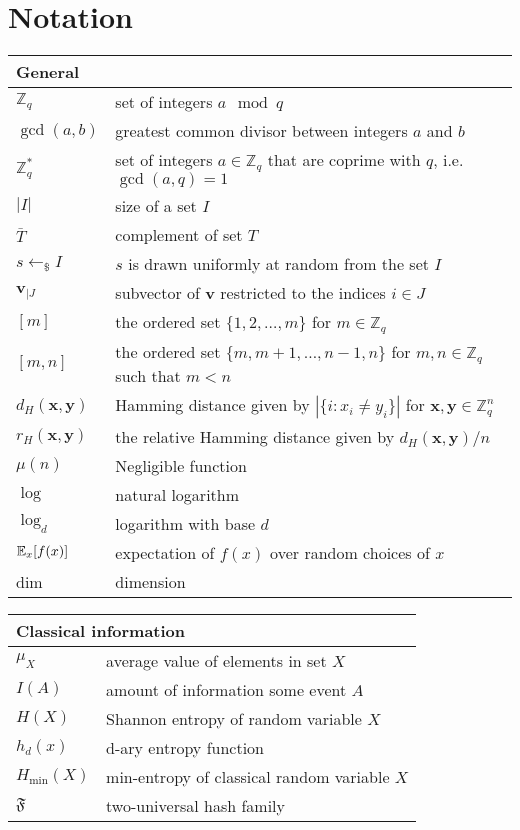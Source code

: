 \chapter*{Notation}


\newcommand{\tabstart}[1]{\noindent \begin{tabular}{p{2.95cm}p{12cm}}
    \multicolumn{2}{l}{{\bf #1}} \\ 
    \hline}

\newcommand{\tabstop}{\hline \end{tabular}}

\newcommand{\tabinter}{\vspace{1ex}}

\tabstart{General}
$\mathbb{Z}_q$ & set of integers $a \mod q$\\
$\gcd (a,b)$ & greatest common divisor between integers $a$ and $b$ \\
$\mathbb{Z}^*_q$ & set of integers $a\in\mathbb{Z}_q$ that are coprime with $q$, i.e. $\gcd (a,q) = 1$ \\
$|I|$ & size of a set $I$ \\
$\bar{T}$ & complement of set $T$ \\
$s\leftarrow_{\$}I$ & $s$ is drawn uniformly at random from the set $I$ \\
$\bm{v}_{|J}$ & subvector of $\bm{v}$ restricted to the indices $i \in J$ \\
$[m]$ & the ordered set $\{1, 2, \ldots, m\}$ for $m\in \mathbb{Z}_q$ \\
$[m, n]$ & the ordered set $\{m, m+1, \dots, n-1, n\}$ for $m, n\in \mathbb{Z}_q$ such that $m<n$ \\
$d_H(\bm{x}, \bm{y})$ & Hamming distance given by $ |\{ i : x_i \neq y_i \}|$ for $\bm{x},\bm{y}\in\mathbb{Z}^n_q$ \\
$r_H(\bm{x}, \bm{y})$ & the relative Hamming distance given by $d_H(\bm{x}, \bm{y})/n$ \\
$\mu(n)$ & Negligible function \\
  $\log$ & natural logarithm  \\
 $\log_d$ & logarithm with base $d$ \\
  $\operatorname*{\mathbb{E}}_{x}[f(x)]$ & expectation of $f(x)$ over random choices of $x$ \\
  dim & dimension \\
\tabstop

\tabinter

\tabstart{Classical information}
$\mu_X$ & average value of elements in set $X$\\
$I(A)$ & amount of information some event $A$ \\
$H(X)$ & Shannon entropy of random variable $X$\\
$h_d(x)$ & d-ary entropy function \\
$H_{\min}(X)$ & min-entropy of classical random variable $X$ \\
$\mathfrak{F}$ & two-universal hash family \\
\tabstop

